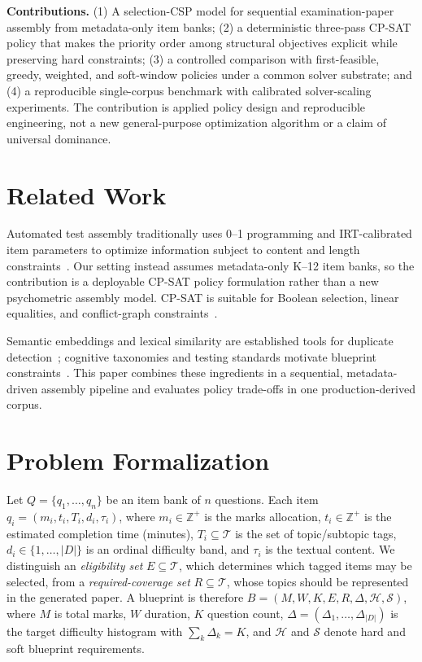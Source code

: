 \documentclass[runningheads]{llncs}
\begin{document}
\noindent\textbf{Contributions.} (1) A selection-CSP model for sequential examination-paper assembly from metadata-only item banks; (2) a deterministic three-pass CP-SAT policy that makes the priority order among structural objectives explicit while preserving hard constraints; (3) a controlled comparison with first-feasible, greedy, weighted, and soft-window policies under a common solver substrate; and (4) a reproducible single-corpus benchmark with calibrated solver-scaling experiments. The contribution is applied policy design and reproducible engineering, not a new general-purpose optimization algorithm or a claim of universal dominance.

\section{Related Work}
Automated test assembly traditionally uses 0--1 programming and IRT-calibrated item parameters to optimize information subject to content and length constraints~\cite{theunissen1985,vanderLinden2005,lord1980}. Our setting instead assumes metadata-only K--12 item banks, so the contribution is a deployable CP-SAT policy formulation rather than a new psychometric assembly model. CP-SAT is suitable for Boolean selection, linear equalities, and conflict-graph constraints~\cite{nieuwenhuis2006,perron2023}.

Semantic embeddings and lexical similarity are established tools for duplicate detection~\cite{reimers2019,devlin2019,charikar2002}; cognitive taxonomies and testing standards motivate blueprint constraints~\cite{bloom1956,anderson2001,standards2014}. This paper combines these ingredients in a sequential, metadata-driven assembly pipeline and evaluates policy trade-offs in one production-derived corpus.

\section{Problem Formalization}
\label{sec:formalization}

Let $Q=\{q_1,\dots,q_n\}$ be an item bank of $n$ questions.
Each item $q_i=(m_i,t_i,T_i,d_i,\tau_i)$, where $m_i\in\mathbb{Z}^+$ is the marks allocation, $t_i\in\mathbb{Z}^+$ is the estimated completion time (minutes), $T_i\subseteq\mathcal{T}$ is the set of topic/subtopic tags, $d_i\in\{1,\dots,|D|\}$ is an ordinal difficulty band, and $\tau_i$ is the textual content.
We distinguish an \emph{eligibility set} $E\subseteq\mathcal{T}$, which determines which tagged items may be selected, from a \emph{required-coverage set} $R\subseteq\mathcal{T}$, whose topics should be represented in the generated paper.
A blueprint is therefore $B=(M,W,K,E,R,\Delta,\mathcal{H},\mathcal{S})$, where $M$ is total marks, $W$ duration, $K$ question count, $\Delta=(\Delta_1,\dots,\Delta_{|D|})$ is the target difficulty histogram with $\sum_k\Delta_k=K$, and $\mathcal{H}$ and $\mathcal{S}$ denote hard and soft blueprint requirements.
\end{document}
